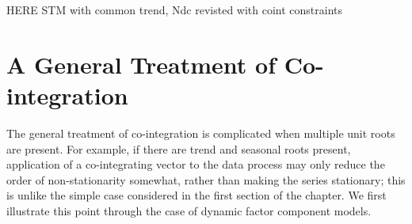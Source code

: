\documentclass[a4paper]{book}
\begin{document}
HERE STM with common trend, Ndc revisted with coint constraints





\section{A General Treatment of Co-integration}
\label{sec:coint-gen}
 
The general treatment of co-integration is complicated when 
  multiple unit roots are present.
For example, if there are trend and seasonal roots present, 
 application of a co-integrating vector to
the data process may only reduce the order of non-stationarity somewhat,
 rather than making the series stationary;
  this is unlike the simple case considered in the first section of the chapter.
  We first illustrate this point through the case of 
 dynamic factor component models.  
 
\end{document}
